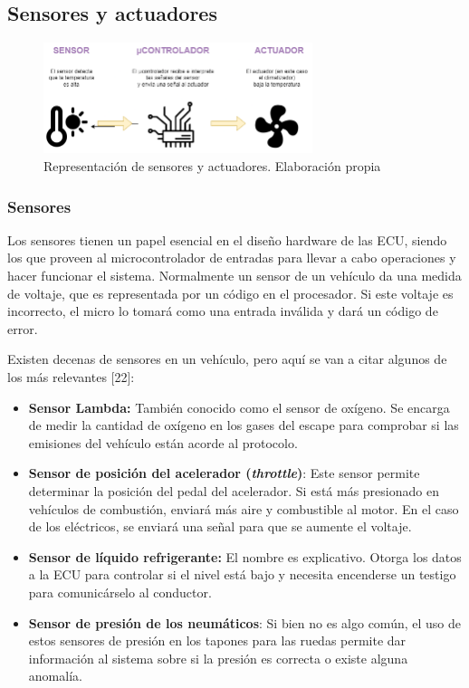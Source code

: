\newpage
\subsection{Sensores y actuadores}

\begin{figure}[h]
    \centering
    \includegraphics[width=0.70\textwidth]{imagenes/diagrama_sensor_actuador.png}
    \caption{Representación de sensores y actuadores. Elaboración propia}
\end{figure}

\subsubsection*{Sensores}

Los sensores tienen un papel esencial en el diseño hardware de las ECU, siendo los que proveen al microcontrolador de entradas para llevar a cabo operaciones y hacer funcionar el sistema. Normalmente un sensor de un vehículo da una medida de voltaje, que es representada por un código en el procesador. Si este voltaje es incorrecto, el micro lo tomará como una entrada inválida y dará un código de error. 

Existen decenas de sensores en un vehículo, pero aquí se van a citar algunos de los más relevantes [22]:


\begin{itemize}
    \item \textbf{Sensor Lambda: }También conocido como el sensor de oxígeno. Se encarga de medir la cantidad de oxígeno en los gases del escape para comprobar si las emisiones del vehículo están acorde al protocolo. 
    \item \textbf{Sensor de posición del acelerador (\textit{throttle})}: Este sensor permite determinar la posición del pedal del acelerador. Si está más presionado en vehículos de combustión, enviará más aire y combustible al motor. En el caso de los eléctricos, se enviará una señal para que se aumente el voltaje.
    \item \textbf{Sensor de líquido refrigerante: }El nombre es explicativo. Otorga los datos a la ECU para controlar si el nivel está bajo y necesita encenderse un testigo para comunicárselo al conductor.
    \item \textbf{Sensor de presión de los neumáticos}: Si bien no es algo común, el uso de estos sensores de presión en los tapones para las ruedas permite dar información al sistema sobre si la presión es correcta o existe alguna anomalía.
\end{itemize}

